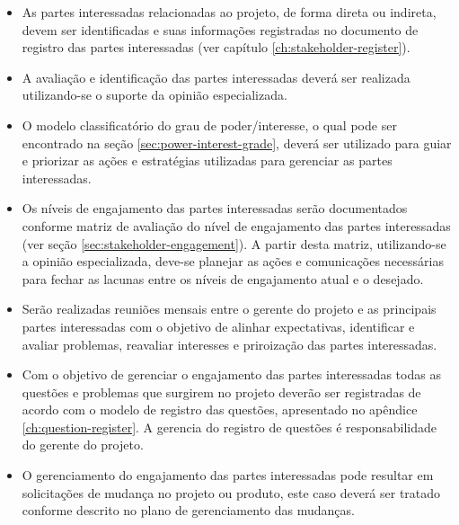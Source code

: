 \begin{itemize}
	\item As partes interessadas relacionadas ao projeto, de forma direta ou indireta, devem ser identificadas e suas informações registradas no documento de registro das partes interessadas (ver capítulo \ref{ch:stakeholder-register}).
	\item A avaliação e identificação das partes interessadas deverá ser realizada utilizando-se o suporte da opinião especializada.
	\item O modelo classificatório do grau de poder/interesse, o qual pode ser encontrado na seção \ref{sec:power-interest-grade}, deverá ser utilizado para guiar e priorizar as ações e estratégias utilizadas para gerenciar as partes interessadas. %
	\item Os níveis de engajamento das partes interessadas serão documentados conforme matriz de avaliação do nível de engajamento das partes interessadas (ver seção \ref{sec:stakeholder-engagement}). A partir desta matriz, utilizando-se a opinião especializada, deve-se planejar as ações e comunicações necessárias para fechar as lacunas entre os níveis de engajamento atual e o desejado.
	\item Serão realizadas reuniões mensais entre o gerente do projeto e as principais partes interessadas com o objetivo de alinhar expectativas, identificar e avaliar problemas, reavaliar interesses e priroização das partes interessadas.
	\item Com o objetivo de gerenciar o engajamento das partes interessadas todas as questões e problemas que surgirem no projeto deverão ser registradas de acordo com o modelo de registro das questões, apresentado no apêndice \ref{ch:question-register}. A gerencia do registro de questões é responsabilidade do gerente do projeto.
	\item O gerenciamento do engajamento das partes interessadas pode resultar em solicitações de mudança no projeto ou produto, este caso deverá ser tratado conforme descrito no plano de gerenciamento das mudanças.
\end{itemize}

